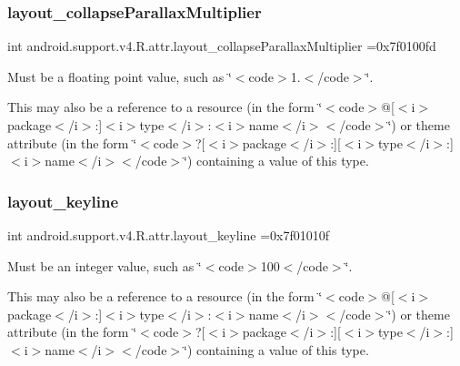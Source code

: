 \subsubsection{\texorpdfstring{layout\+\_\+collapse\+Parallax\+Multiplier}{layout\_collapseParallaxMultiplier}}
{\footnotesize\ttfamily int android.\+support.\+v4.\+R.\+attr.\+layout\+\_\+collapse\+Parallax\+Multiplier =0x7f0100fd\hspace{0.3cm}{\ttfamily [static]}}

Must be a floating point value, such as \char`\"{}$<$code$>$1.$<$/code$>$\char`\"{}. 

This may also be a reference to a resource (in the form \char`\"{}$<$code$>$@\mbox{[}$<$i$>$package$<$/i$>$\+:\mbox{]}$<$i$>$type$<$/i$>$\+:$<$i$>$name$<$/i$>$$<$/code$>$\char`\"{}) or theme attribute (in the form \char`\"{}$<$code$>$?\mbox{[}$<$i$>$package$<$/i$>$\+:\mbox{]}\mbox{[}$<$i$>$type$<$/i$>$\+:\mbox{]}$<$i$>$name$<$/i$>$$<$/code$>$\char`\"{}) containing a value of this type. \mbox{\label{classandroid_1_1support_1_1v4_1_1R_1_1attr_aa53f79e9969f32f33d11ad397f0b687b}} 
\subsubsection{\texorpdfstring{layout\+\_\+keyline}{layout\_keyline}}
{\footnotesize\ttfamily int android.\+support.\+v4.\+R.\+attr.\+layout\+\_\+keyline =0x7f01010f\hspace{0.3cm}{\ttfamily [static]}}

Must be an integer value, such as \char`\"{}$<$code$>$100$<$/code$>$\char`\"{}. 

This may also be a reference to a resource (in the form \char`\"{}$<$code$>$@\mbox{[}$<$i$>$package$<$/i$>$\+:\mbox{]}$<$i$>$type$<$/i$>$\+:$<$i$>$name$<$/i$>$$<$/code$>$\char`\"{}) or theme attribute (in the form \char`\"{}$<$code$>$?\mbox{[}$<$i$>$package$<$/i$>$\+:\mbox{]}\mbox{[}$<$i$>$type$<$/i$>$\+:\mbox{]}$<$i$>$name$<$/i$>$$<$/code$>$\char`\"{}) containing a value of this type. \mbox{\label{classandroid_1_1support_1_1v4_1_1R_1_1attr_afe433c5f79342959f5c95f8fa7335ec2}} 

